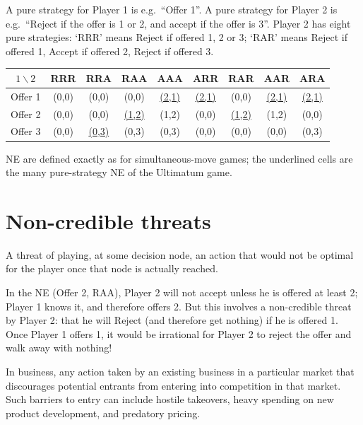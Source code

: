 \documentclass[11pt,a4paper,openany]{book}
\begin{document}
\begin{exbox}[title=Ultimatum game in normal form]
A pure strategy for Player 1 is e.g.\ ``Offer 1''. A pure strategy for Player 2 is e.g.\
``Reject if the offer is 1 or 2, and accept if the offer is 3''. Player 2 has eight pure
strategies: `RRR' means Reject if offered 1, 2 or 3; `RAR' means Reject if offered 1, Accept
if offered 2, Reject if offered 3.
\begin{center}
\small
\setlength{\tabcolsep}{3pt}
\begin{tabular}{c|cccccccc}
$1 \backslash 2$ & RRR & RRA & RAA & AAA & ARR & RAR & AAR & ARA \\ \hline
Offer 1 & (0,0) & (0,0) & (0,0) & \underline{(2,1)} & \underline{(2,1)} & (0,0) & \underline{(2,1)} & \underline{(2,1)} \\
Offer 2 & (0,0) & (0,0) & \underline{(1,2)} & (1,2) & (0,0) & \underline{(1,2)} & (1,2) & (0,0) \\
Offer 3 & (0,0) & \underline{(0,3)} & (0,3) & (0,3) & (0,0) & (0,0) & (0,0) & (0,3)
\end{tabular}
\end{center}
NE are defined exactly as for simultaneous-move games; the underlined cells are the many
pure-strategy NE of the Ultimatum game.
\end{exbox}


\section{Non-credible threats}

\begin{defnbox}[title=Non-credible threat]
A threat of playing, at some decision node, an action that would not be optimal for the
player once that node is actually reached.
\end{defnbox}

\begin{exbox}[title={Ultimatum game: (Offer 2, RAA)}]
In the NE (Offer 2, RAA), Player 2 will not accept unless he is offered at least 2; Player 1
knows it, and therefore offers 2. But this involves a non-credible threat by Player 2: that he
will Reject (and therefore get nothing) if he is offered 1. Once Player 1 offers 1, it would
be irrational for Player 2 to reject the offer and walk away with nothing!
\end{exbox}


\begin{defnbox}[title=Strategic entry deterrence]
In business, any action taken by an existing business in a particular market that
discourages potential entrants from entering into competition in that market. Such barriers
to entry can include hostile takeovers, heavy spending on new product development, and
predatory pricing.
\end{defnbox}
\end{document}
